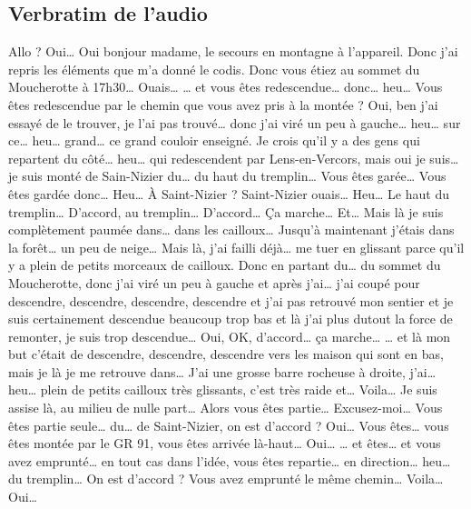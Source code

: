 


\subsection{Verbratim de l'audio}


\begin{dialogue*}
  \Sec Allo ?
  \Req Oui…
  \Sec Oui bonjour madame, le secours en montagne à l'appareil. Donc
  j'ai repris les éléments que m'a donné le \ac{codis}. Donc vous
  étiez au sommet du Moucherotte à 17h30…
  \Req Ouais…
  \Sec … et vous êtes redescendue… donc… heu… Vous êtes redescendue
  par le chemin que vous avez pris à la montée ?
  \Req Oui, ben j'ai essayé de le trouver, je l'ai pas trouvé… donc
  j'ai viré un peu à gauche… heu… sur ce… heu… grand… ce grand couloir
  enseigné. Je crois qu'il y a des gens qui repartent du côté… heu…
  qui redescendent par Lens-en-Vercors, mais oui je suis… je suis
  monté de Sain-Nizier du… du haut du tremplin…
  \Sec Vous êtes garée… Vous êtes gardée donc… Heu… À Saint-Nizier ?
  \Req Saint-Nizier ouais… Heu… Le haut du tremplin…
  \Sec D'accord, au tremplin… D'accord… Ça marche…
  \Req Et… Mais là je suis complètement paumée dans… dans les
  cailloux… Jusqu'à maintenant j’étais dans la forêt… un peu de neige…
  Mais là, j'ai failli déjà… me tuer en glissant parce qu’il y a plein
  de petits morceaux de cailloux. Donc en partant du… du sommet du
  Moucherotte, donc j'ai viré un peu à gauche et après j'ai… j'ai
  coupé pour descendre, descendre, descendre, descendre et j'ai pas retrouvé mon
  sentier et je suis certainement descendue beaucoup trop bas et là
  j'ai plus dutout la force de remonter, je suis trop descendue…
  \Sec {} Oui, OK, d'accord… ça marche…
  \Req … et là mon but c'était de descendre, descendre, descendre vers
  les maison qui sont en bas, mais je là je me retrouve dans… J'ai une
  grosse barre rocheuse à droite, j'ai… heu… plein de petits cailloux
  très glissants, c'est très raide et… Voila… Je suis assise là, au
  milieu de nulle part…
  \Sec {} Alors vous êtes partie…
  Excusez-moi… Vous êtes partie seule… du… de Saint-Nizier, on est
  d'accord ?
  \Req Oui…
  \Sec Vous êtes… vous êtes montée par le GR 91, vous êtes arrivée
  là-haut…
  \Req {} Oui…
  \Sec … et êtes… et vous avez emprunté… en tout cas dans l'idée, vous
  êtes repartie… en direction… heu… du tremplin… On est d'accord ?
  Vous avez emprunté le même chemin…
  \Req {} Voila… Oui…

\end{dialogue*}

